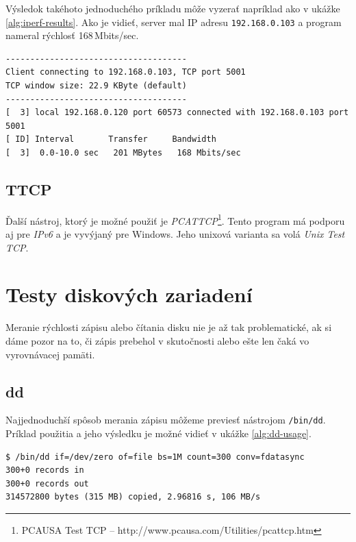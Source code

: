 Výsledok takéhoto jednoduchého príkladu môže vyzerať napríklad ako v ukážke
\ref{alg:iperf-results}. Ako je vidieť, server mal IP adresu
\texttt{192.168.0.103} a program nameral rýchlosť 168\,Mbits/sec.
\\
\renewcommand{\lstlistingname}{Ukážka}
\begin{lstlisting}[label=alg:iperf-results,caption=Výstup z programu iperf]
-------------------------------------
Client connecting to 192.168.0.103, TCP port 5001
TCP window size: 22.9 KByte (default)
-------------------------------------
[  3] local 192.168.0.120 port 60573 connected with 192.168.0.103 port 5001
[ ID] Interval       Transfer     Bandwidth
[  3]  0.0-10.0 sec   201 MBytes   168 Mbits/sec
\end{lstlisting}
\renewcommand{\lstlistingname}{\listingAlgoritmus}

%
%

\subsection{TTCP}

Ďalší nástroj, ktorý je možné použiť je \emph{PCATTCP}\footnote{PCAUSA Test TCP
-- http://www.pcausa.com/Utilities/pcattcp.htm}. Tento program má podporu aj
pre \emph{IPv6} a je vyvýjaný pre Windows. Jeho unixová varianta sa volá
\emph{Unix Test TCP}. 

\section{Testy diskových zariadení}

Meranie rýchlosti zápisu alebo čítania disku nie je až tak problematické, ak si
dáme pozor na to, či zápis prebehol v skutočnosti alebo ešte len čaká vo
vyrovnávacej pamäti.

%
%

\subsection{dd}

Najjednoduchší spôsob merania zápisu môžeme previesť
nástrojom \texttt{/bin/dd}. Príklad použitia a jeho výsledku je možné vidieť v
ukážke \ref{alg:dd-usage}.
\\
\renewcommand{\lstlistingname}{Ukážka}
\begin{lstlisting}[label=alg:dd-usage,caption=Príklad použitia a výsledok nástroja dd]
$ /bin/dd if=/dev/zero of=file bs=1M count=300 conv=fdatasync
300+0 records in
300+0 records out
314572800 bytes (315 MB) copied, 2.96816 s, 106 MB/s
\end{lstlisting}
\renewcommand{\lstlistingname}{\listingAlgoritmus}

